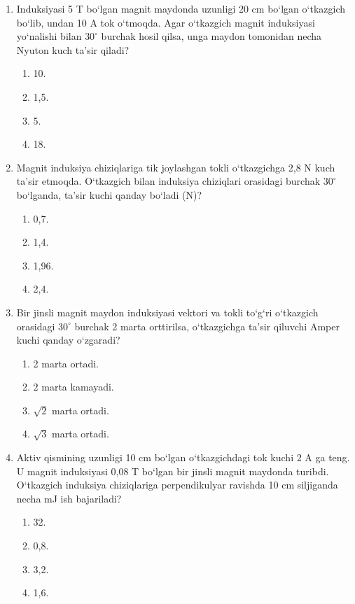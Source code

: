 \begin{enumerate}
\item Induksiyasi 5 T bo‘lgan magnit maydonda uzunligi 20 cm bo‘lgan o‘tkazgich bo‘lib, undan 10 A tok o‘tmoqda. Agar o‘tkazgich magnit induksiyasi yo‘nalishi bilan $30^\circ$ burchak hosil qilsa, unga maydon tomonidan necha Nyuton kuch ta’sir qiladi?
\begin{enumerate}[label=\Alph*)]
\item 10.
\item 1,5.
\item 5.
\item 18.
\end{enumerate}

\item Magnit induksiya chiziqlariga tik joylashgan tokli o‘tkazgichga 2,8 N kuch ta’sir etmoqda. O‘tkazgich bilan induksiya chiziqlari orasidagi burchak $30^\circ$ bo‘lganda, ta’sir kuchi qanday bo‘ladi (N)?
\begin{enumerate}[label=\Alph*)]
\item 0,7.
\item 1,4.
\item 1,96.
\item 2,4.
\end{enumerate}

\item Bir jinsli magnit maydon induksiyasi vektori va tokli to‘g‘ri o‘tkazgich orasidagi $30^\circ$ burchak 2 marta orttirilsa, o‘tkazgichga ta’sir qiluvchi Amper kuchi qanday o‘zgaradi?
\begin{enumerate}[label=\Alph*)]
\item 2 marta ortadi.
\item 2 marta kamayadi.
\item $\sqrt{2}$ marta ortadi.
\item $\sqrt{3}$ marta ortadi.
\end{enumerate}

\setcounter{enumi}{10}
\item Aktiv qismining uzunligi 10 cm bo‘lgan o‘tkazgichdagi tok kuchi 2 A ga teng. U magnit induksiyasi 0,08 T bo‘lgan bir jinsli magnit maydonda turibdi. O‘tkazgich induksiya chiziqlariga perpendikulyar ravishda 10 cm siljiganda necha mJ ish bajariladi?
\begin{enumerate}[label=\Alph*)]
\item 32.
\item 0,8.
\item 3,2.
\item 1,6.
\end{enumerate}


\end{enumerate}
